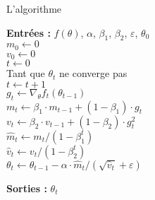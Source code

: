 \documentclass[11pt,aspectratio=169,xcolor=dvipsnames, french]{beamer}
\begin{document}
\begin{frame}{L'algorithme}

\textbf{Entrées :} $f(\theta)$, $\alpha$, $\beta_1$, $\beta_2$, $\varepsilon$, $\theta_0$\\
\hspace*{0.5cm}   $m_0\longleftarrow 0$ \\
\hspace*{0.5cm}  $v_0\longleftarrow 0$ \\  
\hspace*{0.5cm}  $t\longleftarrow 0$ \\
\hspace*{0.5cm}Tant que $\theta_t$ ne converge pas\\
   \hspace*{1.5cm} $t\longleftarrow t+1$\\
   \hspace*{1.5cm} $g_t \longleftarrow \nabla_{\theta}f_t(\theta_{t-1})$\\
  \hspace*{1.5cm}  $m_t \longleftarrow \beta_1\cdotp m_{t-1}+(1-\beta_1)\cdotp g_t$\\
   \hspace*{1.5cm} $v_t \longleftarrow \beta_2\cdotp v_{t-1}+(1-\beta_2)\cdotp g_t^2$\\
   \hspace*{1.5cm} $\widehat m_t \longleftarrow m_t/(1-\beta_1^t)$\\
   \hspace*{1.5cm} $\widehat v_t \longleftarrow v_t/(1-\beta_2^t)$\\
   \hspace*{1.5cm} $\theta_t \longleftarrow \theta_{t-1}-\alpha\cdotp \widehat m_t/(\sqrt{\widehat v_t}+\varepsilon)$
  
\hspace*{0.5cm} \textbf{Sorties :} $\theta_t$
\end{frame}
\end{document}
